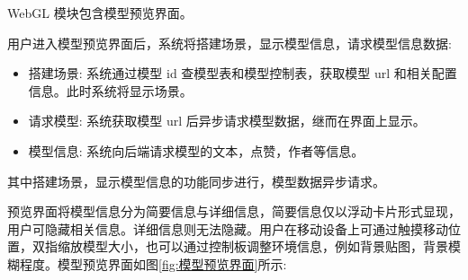 WebGL 模块包含模型预览界面。

用户进入模型预览界面后，系统将搭建场景，显示模型信息，请求模型信息数据:
\begin{itemize}
  \item 搭建场景: 系统通过模型 id 查模型表和模型控制表，获取模型 url 和相关配置信息。此时系统将显示场景。
  \item 请求模型: 系统获取模型 url 后异步请求模型数据，继而在界面上显示。
  \item 模型信息: 系统向后端请求模型的文本，点赞，作者等信息。
\end{itemize}

其中搭建场景，显示模型信息的功能同步进行，模型数据异步请求。

预览界面将模型信息分为简要信息与详细信息，简要信息仅以浮动卡片形式显现，用户可隐藏相关信息。详细信息则无法隐藏。用户在移动设备上可通过触摸移动位置，双指缩放模型大小，也可以通过控制板调整环境信息，例如背景贴图，背景模糊程度。模型预览界面如图\ref{fig:模型预览界面}所示:

